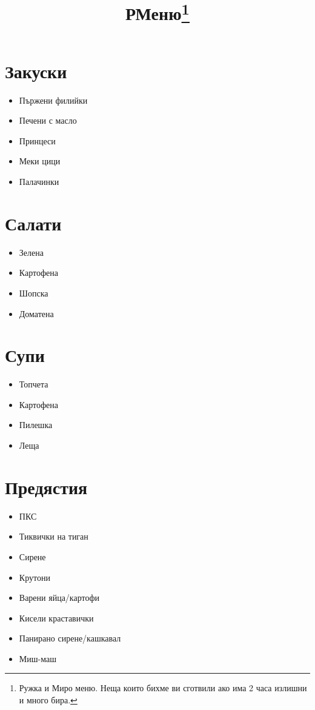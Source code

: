 \documentclass{article}
\title{РМеню\footnote{Ружка и Миро меню. Неща които бихме ви сготвили ако има 2 часа излишни и много бира.}}
\newenvironment{mylist}
{
  \begin{itemize}
  \setlength{\itemsep}{1pt}
  \setlength{\parskip}{0pt}
  \setlength{\parsep}{0pt}
}
{
\end{itemize}
}
\begin{document}
\maketitle
\begin{multicols}{2}
\section{Закуски}
\begin{mylist}
    \item{Пържени филийки}
    \item{Печени с масло}
    \item{Принцеси}
    \item{Меки цици}
    \item{Палачинки}
\end{mylist}

\section{Салати}
\begin{mylist}
    \item{Зелена}
    \item{Картофена}
    \item{Шопска}
    \item{Доматена}
\end{mylist}

\section{Супи}
\begin{mylist}
    \item{Топчета}
    \item{Картофена}
    \item{Пилешка}
    \item{Леща}
\end{mylist}

\section{Предястия}
\begin{mylist}
    \item{ПКС}
    \item{Тиквички на тиган}
    \item{Сирене}
    \item{Крутони}
    \item{Варени яйца/картофи}
    \item{Кисели краставички}
    \item{Панирано сирене/кашкавал}
    \item{Миш-маш}
\end{mylist}


\end{multicols}
\end{document}
